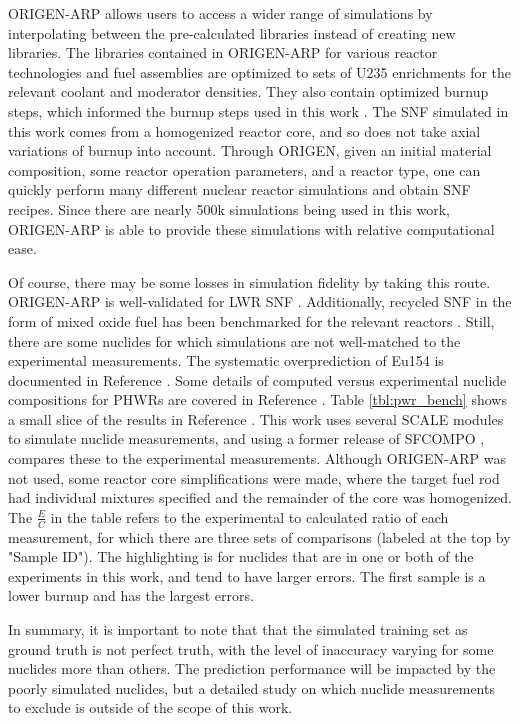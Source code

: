 \gls{ORIGEN-ARP} allows users to access a wider range of simulations by
interpolating between the pre-calculated libraries instead of creating new
libraries.  The libraries contained in \gls{ORIGEN-ARP} for various reactor
technologies and fuel assemblies are optimized to sets of \gls{U235}
enrichments for the relevant coolant and moderator densities.  They also
contain optimized burnup steps, which informed the burnup steps used in this
work \cite{origenarp}.  The \gls{SNF} simulated in this work comes from a
homogenized reactor core, and so does not take axial variations of burnup into
account.  Through \gls{ORIGEN}, given an initial material composition, some
reactor operation parameters, and a reactor type, one can quickly perform many
different nuclear reactor simulations and obtain \gls{SNF} recipes. Since there
are nearly 500k simulations being used in this work, \gls{ORIGEN-ARP} is able
to provide these simulations with relative computational ease. 

Of course, there may be some losses in simulation fidelity by taking this
route.  \gls{ORIGEN-ARP} is well-validated for \gls{LWR} \gls{SNF}
\cite{lwr_valid}.  Additionally, recycled \gls{SNF} in the form of mixed oxide
fuel has been benchmarked for the relevant reactors \cite{mox_valid}.  Still,
there are some nuclides for which simulations are not well-matched to the
experimental measurements. The systematic overprediction of Eu154 is documented
in Reference \cite{skutnik_eu154}.  Some details of computed versus
experimental nuclide compositions for \gls{PHWR}s are covered in Reference
\cite{skutnik_2021}. Table \ref{tbl:pwr_bench} shows a small slice of the
results in Reference \cite{pwr_benchmark_2010}.  This work uses several
\gls{SCALE} modules to simulate nuclide measurements, and using a former
release of \gls{SFCOMPO} \cite{sfcompo, valid_sfco}, compares these to the
experimental measurements.  Although \gls{ORIGEN-ARP} was not used, some
reactor core simplifications were made, where the target fuel rod had
individual mixtures specified and the remainder of the core was homogenized.
The $\frac{E}{C}$ in the table refers to the experimental to calculated ratio
of each measurement, for which there are three sets of comparisons (labeled at
the top by "Sample ID").  The highlighting is for nuclides that are in one or
both of the experiments in this work, and tend to have larger errors.  The
first sample is a lower burnup and has the largest errors.

In summary, it is important to note that that the simulated training set as
ground truth is not perfect truth, with the level of inaccuracy varying for
some nuclides more than others.  The prediction performance will be impacted by
the poorly simulated nuclides, but a detailed study on  which nuclide
measurements to exclude is outside of the scope of this work.

